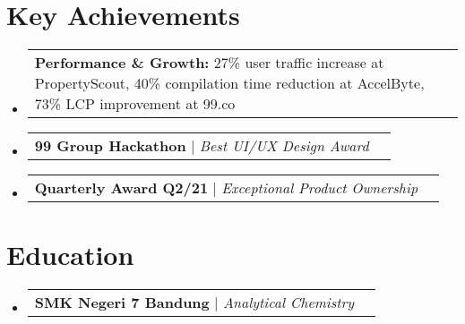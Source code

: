 \documentclass[a4paper, 11pt]{article}
\makeatletter
\newcommand{\resumeProjectHeading}[2]{
    \item
    \begin{tabular*}{0.987\textwidth}{l@{\extracolsep{\fill}}r}
      \small#1\\
    \end{tabular*}\vspace{-7pt}
}
\newcommand{\resumeSubHeadingListStart}{\begin{itemize}[leftmargin=0.1in, label={}]}
\newcommand{\resumeSubHeadingListEnd}{\end{itemize}\vspace{5pt}}
\makeatother
\begin{document}
\section{Key Achievements}
    \resumeSubHeadingListStart
        \resumeProjectHeading
            {\textbf{Performance \& Growth:} 27\% user traffic increase at PropertyScout, 40\% compilation time reduction at AccelByte, 73\% LCP improvement at 99.co}{}
        \resumeProjectHeading
            {\textbf{99 Group Hackathon} $|$ \emph{Best UI/UX Design Award}}{2021}
        \resumeProjectHeading
            {\textbf{Quarterly Award Q2/21} $|$ \emph{Exceptional Product Ownership}}{2021}
    \resumeSubHeadingListEnd

\section{Education}
    \resumeSubHeadingListStart
        \resumeProjectHeading
            {\textbf{SMK Negeri 7 Bandung} $|$ \emph{Analytical Chemistry}}{2009 -- 2011}
    \resumeSubHeadingListEnd
\end{document}

